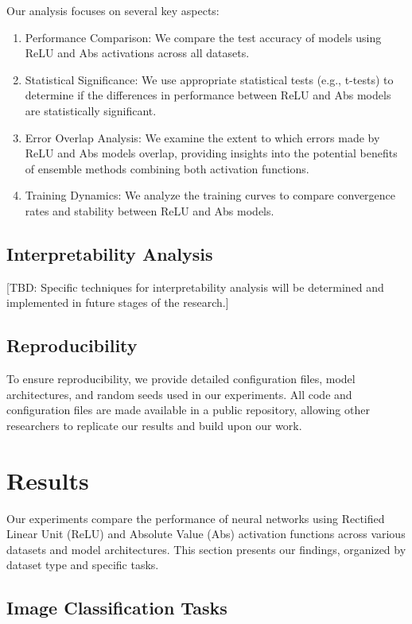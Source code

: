 \documentclass[11pt]{article}
\begin{document}
Our analysis focuses on several key aspects:

\begin{enumerate}
\item Performance Comparison: We compare the test accuracy of models using ReLU and Abs activations across all datasets.
\item Statistical Significance: We use appropriate statistical tests (e.g., t-tests) to determine if the differences in performance between ReLU and Abs models are statistically significant.
\item Error Overlap Analysis: We examine the extent to which errors made by ReLU and Abs models overlap, providing insights into the potential benefits of ensemble methods combining both activation functions.
\item Training Dynamics: We analyze the training curves to compare convergence rates and stability between ReLU and Abs models.
\end{enumerate}

\subsection{Interpretability Analysis}

[TBD: Specific techniques for interpretability analysis will be determined and implemented in future stages of the research.]

\subsection{Reproducibility}

To ensure reproducibility, we provide detailed configuration files, model architectures, and random seeds used in our experiments. All code and configuration files are made available in a public repository, allowing other researchers to replicate our results and build upon our work.

\section{Results}

Our experiments compare the performance of neural networks using Rectified Linear Unit (ReLU) and Absolute Value (Abs) activation functions across various datasets and model architectures. This section presents our findings, organized by dataset type and specific tasks.

\subsection{Image Classification Tasks}
\end{document}
